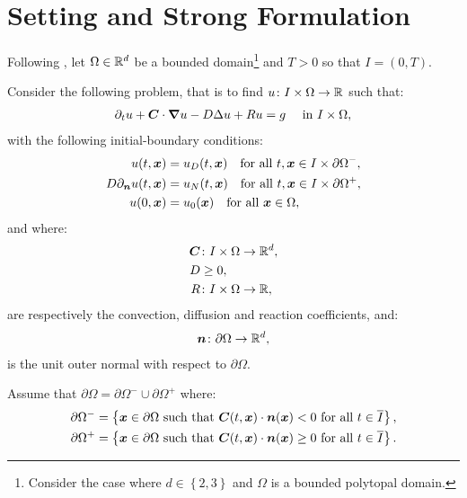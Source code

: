\section{Setting and Strong Formulation}

Following \cite{Feistauer2007}, let $\Omega \in \mathbb{R}^{d}$ be a bounded domain\footnote{Consider the case where $d \in \left\{ 2, 3 \right\}$ and $\Omega$ is a bounded polytopal domain.} and $T > 0$ so that $I = \left( 0, T\right)$.

Consider the following problem, that is to find $u \colon I \times \Omega \rightarrow \mathbb{R}$ such that:
\begin{gather}
    \partial_t u + \bm{C} \cdot \bm{\nabla} u - D \Delta u + R u = g \quad \text{ in } I \times \Omega, \label{equation:cdr}
\end{gather}
with the following initial-boundary conditions:
\begin{align}
    u(t, \bm{x}) &= u_D(t, \bm{x}) \quad \text{for all } t, \bm{x} \in I \times \partial \Omega^-, \label{equation:cdr_dirichlet} \\
    D \partial_{\bm{n}} u(t, \bm{x}) &= u_N(t, \bm{x}) \quad \text{for all } t, \bm{x} \in I \times \partial \Omega^+, \label{equation:cdr_neumann} \\
    u(0, \bm{x}) &= u_0(\bm{x}) \quad \text{for all } \bm{x} \in \Omega, \label{equation:cdr_initial}
\end{align}
and where:
\begin{align}
    \bm{C} & \colon I \times \Omega \rightarrow \mathbb{R}^{d}, \\
    D & \geq 0, \\
    R & \colon I \times \Omega \rightarrow \mathbb{R},
\end{align}
are respectively the convection, diffusion and reaction coefficients, and:
\begin{gather}
    \bm{n} \colon \partial \Omega \rightarrow \mathbb{R}^{d},
\end{gather}
is the unit outer normal with respect to $\partial \Omega$.

Assume that $\partial \Omega = \partial \Omega^- \cup \partial \Omega^+$ where:
\begin{align}
    \partial \Omega^- = \left\{ \bm{x} \in \partial \Omega \text{ such that } \bm{C}(t, \bm{x}) \cdot \bm{n}(\bm{x}) < 0 \text{ for all } t \in \overline{I} \right\}, \\
    \partial \Omega^+ = \left\{ \bm{x} \in \partial \Omega \text{ such that } \bm{C}(t, \bm{x}) \cdot \bm{n}(\bm{x}) \geq 0 \text{ for all } t \in \overline{I} \right\}.
\end{align}

